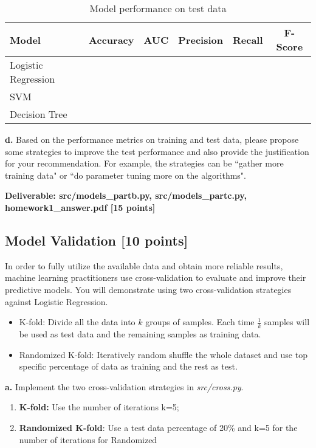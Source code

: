 \documentclass[12pt]{article}
\begin{document}
\begin{table}[h]
\centering
\begin{tabular}{@{}lccccc@{}}
\toprule
Model & Accuracy & AUC & Precision & Recall & F-Score  \\ \midrule
Logistic Regression & & & & &\\
SVM & & & & &\\
Decision Tree & & & & &\\
\bottomrule
\end{tabular}
\caption{Model performance on test data}
\label{tbl:modelc}
\end{table}

\textbf{d.}  Based on the performance metrics on training and test data,  please propose some strategies to improve the test performance and also provide the justification for your recommendation. For example, the strategies can be ``gather more training data" or ``do parameter tuning more on the algorithms". 

\textbf{Deliverable: src/models\_partb.py, src/models\_partc.py, homework1\_answer.pdf [15 points]}

\subsection{Model Validation [10 points]}
In order to fully utilize the available data and obtain more reliable results, machine learning practitioners use cross-validation to evaluate and improve their predictive models. You will demonstrate using two cross-validation strategies against Logistic Regression. 

\begin{itemize}
\item K-fold: Divide all the data into $k$ groups of samples. Each time $\frac{1}{k}$ samples will be used as test data and the remaining samples as training data.
\item Randomized K-fold: Iteratively random shuffle the whole dataset and use top specific percentage of data as training and the rest as test. 
\end{itemize}

\textbf{a.} Implement the two cross-validation strategies in \textit{src/cross.py}. 
\begin{enumerate}
\item \textbf{K-fold:} Use the number of iterations k=5; 
\item \textbf{Randomized K-fold}: Use a test data percentage of 20\% and k=5 for the number of iterations for Randomized
\end{enumerate}
\end{document}
